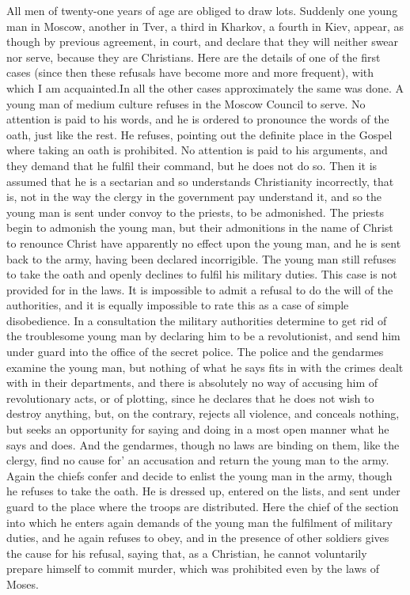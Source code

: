 \documentclass{book}
\begin{document}
All men of twenty-one years of age are obliged to draw lots. Suddenly one young man in Moscow, another in Tver, a third in Kharkov, a fourth in Kiev, appear, as though by previous agreement, in court, and declare that they will neither swear nor serve, because they are Christians. Here are the details of one of the first cases (since then these refusals have become more and more frequent), with which I am acquainted.\footnotemark[1] In all the other cases approximately the same was done. A young man of medium culture refuses in the Moscow Council to serve. No attention is paid to his words, and he is ordered to pronounce the words of the oath, just like the rest. He refuses, pointing out the definite place in the Gospel where taking an oath is prohibited. No attention is paid to his arguments, and they demand that he fulfil their command, but he does not do so. Then it is assumed that he is a sectarian and so understands Christianity incorrectly, that is, not in the way the clergy in the government pay understand it, and so the young man is sent under convoy to the priests, to be admonished. The priests begin to admonish the young man, but their admonitions in the name of Christ to renounce Christ have apparently no effect upon the young man, and he is sent back to the army, having been declared incorrigible. The young man still refuses to take the oath and openly declines to fulfil his military duties. This case is not provided for in the laws. It is impossible to admit a refusal to do the will of the authorities, and it is equally impossible to rate this as a case of simple disobedience. In a consultation the military authorities determine to get rid of the troublesome young man by declaring him to be a revolutionist, and send him under guard into the office of the secret police. The police and the gendarmes examine the young man, but nothing of what he says fits in with the crimes dealt with in their departments, and there is absolutely no way of accusing him of revolutionary acts, or of plotting, since he declares that he does not wish to destroy anything, but, on the contrary, rejects all violence, and conceals nothing, but seeks an opportunity for saying and doing in a most open manner what he says and does. And the gendarmes, though no laws are binding on them, like the clergy, find no cause for’ an accusation and return the young man to the army. Again the chiefs confer and decide to enlist the young man in the army, though he refuses to take the oath. He is dressed up, entered on the lists, and sent under guard to the place where the troops are distributed. Here the chief of the section into which he enters again demands of the young man the fulfilment of military duties, and he again refuses to obey, and in the presence of other soldiers gives the cause for his refusal, saying that, as a Christian, he cannot voluntarily prepare himself to commit murder, which was prohibited even by the laws of Moses.
\end{document}
